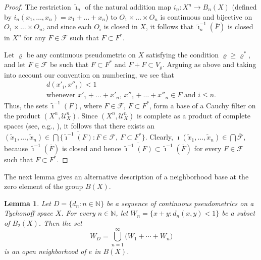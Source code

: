 \documentclass[a4paper,12pt]{amsart}
\newtheorem{lemma}[theorem]{Lemma}
\theoremstyle{definition}
\begin{document}
\begin{proof}
The restriction $\tilde \imath_n$ of the natural addition map $i_n\colon X^n\to 
B_n(X)$ (defined by $i_n(x_1, \dots, x_n) = x_1 + \dots + x_n$) to $O_1\times 
\dots \times O_n$ is continuous and bijective on $O_1\times \dots \times O_n$, 
and since each $O_i$ is closed in $X$, it follows that 
$\tilde \imath_n^{-1}(\overline F)$ is closed in $X^n$ for any $F\in \mathscr 
F$ such that $F\subset F^*$. 

Let $\varrho$ be any continuous pseudometric on $X$ satisfying the 
condition $\varrho\ge \varrho^*$, and let $F\in \mathscr F$ be such that 
$F\subset F^*$ and $F+F\subset V_\varrho$. Arguing as above and taking into 
account our convention on numbering, we see that 
$$
\begin{gathered}
d(x'_i, x''_i)<1\\
\text{whenever $x'_1+ \dots + x'_n,\, x''_1+ \dots + x''_n\in F$ and $i\le n$.}
\end{gathered}
$$ 
Thus, the sets $\tilde\imath^{-1}(F)$, where $F\in \mathscr F$, $F\subset 
F^*$, form a base of a Cauchy filter on the product $(X^n, \mathscr U_X^n)$. 
Since $(X^n, \mathscr U_X^n)$ is complete as a product of complete spaces 
(see, e.g., \cite[Theorem~8.3.9]{Eng}), it follows that there exists an 
$(\tilde x_1, \dots, \tilde x_n)\in \bigcap
\{\overline{\tilde\imath^{-1}(F)}: F\in \mathscr F,\ F\subset F^*\}$. Clearly, 
$\imath(\tilde x_1, \dots, \tilde x_n)\in \bigcap \overline{\mathscr F}$, 
because $\tilde\imath^{-1}(\overline F)$ is closed and hence  
$\overline{\tilde\imath^{-1}(F)} \subset \tilde\imath^{-1}(\overline F)$ for 
every $F\in\mathscr F$ such that $F\subset F^*$.
\end{proof}

The next lemma gives an alternative description of a neighborhood
base at the zero element of the group $B(X)$. 

\begin{lemma}\label{Le:sum}
Let $D=\{d_n: n\in\mathbb{N}\}$ be a sequence of continuous
pseudometrics on a Tychonoff space $X$. For every $n\in\mathbb{N}$,
let $W_n=\{x+y: d_n(x,y)<1\}$ be a subset of $B_2(X)$. Then the set
$$ 
W_D=\bigcup_{n=1}^\infty \big(W_1+\cdots+W_n\big)
$$
is an open neighborhood of $e$ in $B(X)$.
\end{lemma}
\end{document}

